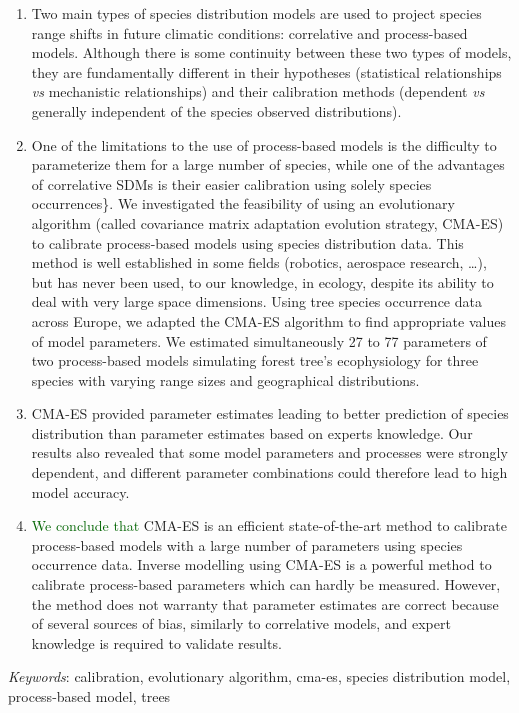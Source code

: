 \documentclass[11pt,]{article}
\renewenvironment{abstract}
 {{%
    \setlength{\leftmargin}{0mm}
    \setlength{\rightmargin}{\leftmargin}%
  }%
  \relax}
 {\endlist}
\begin{document}
\begin{abstract}

    \hbox{\vrule height .2pt width 39.14pc}

    \vskip 8.5pt %

\noindent \begin{enumerate}
\def\labelenumi{\arabic{enumi}.}
\item
  Two main types of species distribution models are used to project
  species range shifts in future climatic conditions: correlative and
  process-based models. Although there is some continuity between these
  two types of models, they are fundamentally different in their
  hypotheses (statistical relationships \emph{vs} mechanistic
  relationships) and their calibration methods (dependent \emph{vs}
  generally independent of the species observed distributions).
\item
  One of the limitations to the use of process-based models is the
  difficulty to parameterize them for a large number of species, while
  one of the advantages of correlative SDMs is their easier calibration
  using solely species occurrences\}. We investigated the feasibility of
  using an evolutionary algorithm (called covariance matrix adaptation
  evolution strategy, CMA-ES) to calibrate process-based models using
  species distribution data. This method is well established in some
  fields (robotics, aerospace research, \ldots), but has never been
  used, to our knowledge, in ecology, despite its ability to deal with
  very large space dimensions. Using tree species occurrence data across
  Europe, we adapted the CMA-ES algorithm to find appropriate values of
  model parameters. We estimated simultaneously 27 to 77 parameters of
  two process-based models simulating forest tree's ecophysiology for
  three species with varying range sizes and geographical distributions.
\item
  CMA-ES provided parameter estimates leading to better prediction of
  species distribution than parameter estimates based on experts
  knowledge. Our results also revealed that some model parameters and
  processes were strongly dependent, and different parameter
  combinations could therefore lead to high model accuracy.
\item
  \textcolor{darkgreen}{We conclude that} CMA-ES is an efficient
  state-of-the-art method to calibrate process-based models with a large
  number of parameters using species occurrence data. Inverse modelling
  using CMA-ES is a powerful method to calibrate process-based
  parameters which can hardly be measured. However, the method does not
  warranty that parameter estimates are correct because of several
  sources of bias, similarly to correlative models, and expert knowledge
  is required to validate results.
\end{enumerate}


\vskip 8.5pt \noindent \emph{Keywords}: calibration, evolutionary
algorithm, cma-es, species distribution model, process-based model,
trees \par

    \hbox{\vrule height .2pt width 39.14pc}



\end{abstract}
\end{document}
